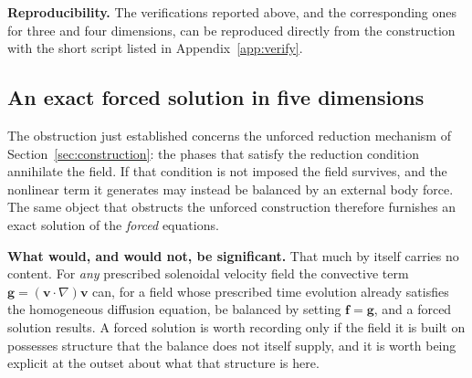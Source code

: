 \documentclass[11pt]{jfm}
\numberwithin{equation}{section}
\begin{document}
\textbf{Reproducibility.} The verifications reported above, and the corresponding ones
for three and four dimensions, can be reproduced directly from the construction with the short
script listed in Appendix~\ref{app:verify}.

\subsection{An exact forced solution in five dimensions}
\label{subsec:5D-forced}
The obstruction just established concerns the unforced reduction mechanism of
Section~\ref{sec:construction}: the phases that satisfy the reduction condition annihilate the
field. If that condition is not imposed the field survives, and the nonlinear term it generates
may instead be balanced by an external body force. The same object that obstructs the unforced
construction therefore furnishes an exact solution of the \emph{forced} equations.

\medskip
\noindent\textbf{What would, and would not, be significant.} That much by itself carries no
content. For \emph{any} prescribed solenoidal velocity field the convective term
$\boldsymbol{g}=(\boldsymbol{v}\cdot\nabla)\boldsymbol{v}$ can, for a field whose prescribed time
evolution already satisfies the homogeneous diffusion equation, be balanced by setting
$\boldsymbol{f}=\boldsymbol{g}$, and a forced solution results. A forced solution is worth
recording only if the field it is built on possesses structure that the balance does not itself
supply, and it is worth being explicit at the outset about what that structure is here.
\end{document}
